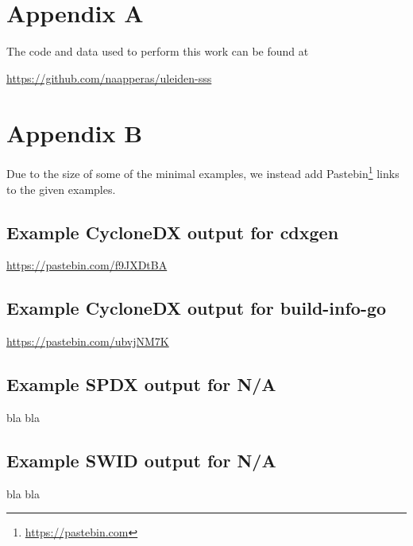 \appendix

\section{Appendix A}

The code and data used to perform this work can be found at 
\begin{center}
    \href{https://github.com/Naapperas/uleiden-sss/tree/main/assignments/2}{https://github.com/naapperas/uleiden-sss}
\end{center}

\section{Appendix B}


Due to the size of some of the minimal examples, we instead add Pastebin\footnote{\href{https://pastebin.com}{https://pastebin.com}} links to the given examples.

\subsection{Example CycloneDX output for \textbf{cdxgen}}

\href{https://pastebin.com/f9JXDtBA}{https://pastebin.com/f9JXDtBA}

\subsection{Example CycloneDX output for \textbf{build-info-go}}

\href{https://pastebin.com/ubvjNM7K}{https://pastebin.com/ubvjNM7K}

\subsection{Example SPDX output for \textbf{N/A}}

bla bla


\subsection{Example SWID output for \textbf{N/A}}

bla bla


